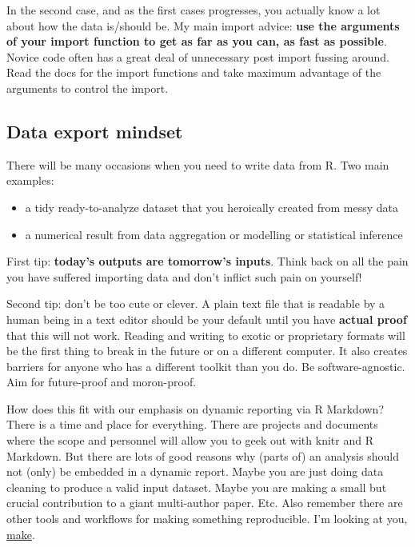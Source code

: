 \documentclass[
]{book}
\providecommand{\tightlist}{%
  \setlength{\itemsep}{0pt}\setlength{\parskip}{0pt}}
\begin{document}
In the second case, and as the first cases progresses, you actually know a lot about how the data is/should be. My main import advice: \textbf{use the arguments of your import function to get as far as you can, as fast as possible}. Novice code often has a great deal of unnecessary post import fussing around. Read the docs for the import functions and take maximum advantage of the arguments to control the import.

\hypertarget{data-export-mindset}{%
\subsection{Data export mindset}\label{data-export-mindset}}

There will be many occasions when you need to write data from R. Two main examples:

\begin{itemize}
\tightlist
\item
  a tidy ready-to-analyze dataset that you heroically created from messy data
\item
  a numerical result from data aggregation or modelling or statistical inference
\end{itemize}

First tip: \textbf{today's outputs are tomorrow's inputs}. Think back on all the pain you have suffered importing data and don't inflict such pain on yourself!

Second tip: don't be too cute or clever. A plain text file that is readable by a human being in a text editor should be your default until you have \textbf{actual proof} that this will not work. Reading and writing to exotic or proprietary formats will be the first thing to break in the future or on a different computer. It also creates barriers for anyone who has a different toolkit than you do. Be software-agnostic. Aim for future-proof and moron-proof.

How does this fit with our emphasis on dynamic reporting via R Markdown? There is a time and place for everything. There are projects and documents where the scope and personnel will allow you to geek out with knitr and R Markdown. But there are lots of good reasons why (parts of) an analysis should not (only) be embedded in a dynamic report. Maybe you are just doing data cleaning to produce a valid input dataset. Maybe you are making a small but crucial contribution to a giant multi-author paper. Etc. Also remember there are other tools and workflows for making something reproducible. I'm looking at you, \href{https://kbroman.org/minimal_make/}{make}.
\end{document}
